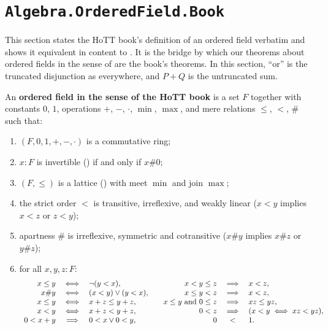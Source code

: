 \section{\texttt{Algebra.OrderedField.Book}}

This section states the HoTT book's definition of an ordered field verbatim and shows it equivalent in content to . It is the bridge by which our theorems about ordered fields in the sense of  are the book's theorems. In this section, ``or'' is the truncated disjunction as everywhere, and $P + Q$ is the untruncated sum.

\begin{definition}
  \label{IsOrderedFieldBook}
  An \textbf{ordered field in the sense of the HoTT book} is a set $F$ together with constants $0$, $1$, operations $+$, $-$, $\cdot$, $\min$, $\max$, and mere relations $\le$, $<$, $\#$ such that:
  \begin{enumerate}
  \item $(F, 0, 1, +, -, \cdot)$ is a commutative ring;
  \item $x : F$ is invertible () if and only if $x \# 0$;
  \item $(F, \le)$ is a lattice () with meet $\min$ and join $\max$;
  \item the strict order $<$ is transitive, irreflexive, and weakly linear ($x < y$ implies $x < z$ or $z < y$);
  \item apartness $\#$ is irreflexive, symmetric and cotransitive ($x \# y$ implies $x \# z$ or $y \# z$);
  \item for all $x, y, z : F$:
    \[
      \begin{array}{r c l @{\qquad} r c l}
        x \le y & \iff & \neg (y < x), & x < y \le z & \implies & x < z, \\
        x \# y & \iff & (x < y) \lor (y < x), & x \le y < z & \implies & x < z, \\
        x \le y & \iff & x + z \le y + z, & x \le y \text{ and } 0 \le z & \implies & x z \le y z, \\
        x < y & \iff & x + z < y + z, & 0 < z & \implies & (x < y \iff x z < y z), \\
        0 < x + y & \implies & 0 < x \lor 0 < y, & 0 & < & 1.
      \end{array}
    \]
  \end{enumerate}
\end{definition}


